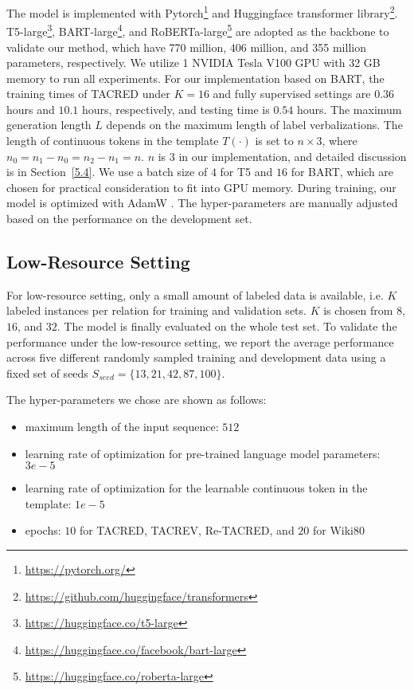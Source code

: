 \documentclass[11pt]{article}
\begin{document}
The model is implemented with Pytorch\footnote{\url{https://pytorch.org/}} and Huggingface transformer library\footnote{\url{https://github.com/huggingface/transformers}}. T5-large\footnote{\url{https://huggingface.co/t5-large}}, BART-large\footnote{\url{https://huggingface.co/facebook/bart-large}}, and RoBERTa-large\footnote{\url{https://huggingface.co/roberta-large}} are adopted as the backbone to validate our method, which have 770 million, 406 million, and 355 million parameters, respectively.  We utilize 1 NVIDIA Tesla V100 GPU with 32 GB memory to run all experiments. For our implementation based on BART, the training times of TACRED under $K=16$ and fully supervised settings are $0.36$ hours and $10.1$ hours, respectively, and testing time is $0.54$ hours. The maximum generation length $L$ depends on the maximum length of label verbalizations. The length of continuous tokens in the template $T(\cdot)$ is set to $n\times3$, where $n_0=n_1-n_0=n_2-n_1=n$. $n$ is $3$ in our implementation, and detailed discussion is in Section~\ref{5.4}. We use a batch size of $4$ for T5 and $16$ for BART, which are chosen for practical consideration to fit into GPU memory. During training, our model is optimized with AdamW \cite{DBLP:conf/iclr/LoshchilovH19}. The hyper-parameters are manually adjusted based on the performance on the development set. 

\subsection{Low-Resource Setting}
For low-resource setting, only a small amount of labeled data is available, i.e. $K$ labeled instances per relation for training and validation sets. $K$ is chosen from $8$, $16$, and $32$. The model is finally evaluated on the whole test set. To validate the performance under the low-resource setting, we report the average performance across five different randomly sampled training and development data using a fixed set of seeds $S_{seed}=\{13, 21, 42, 87, 100\}$.

The hyper-parameters we chose are shown as follows:
\begin{itemize}
	\item maximum length of the input sequence: $512$
	\item learning rate of optimization for pre-trained language model parameters: $3e-5$
	\item learning rate of optimization for the learnable continuous token in the template: $1e-5$
	\item epochs: $10$ for TACRED, TACREV, Re-TACRED,  and $20$ for Wiki80
\end{itemize}
\end{document}
